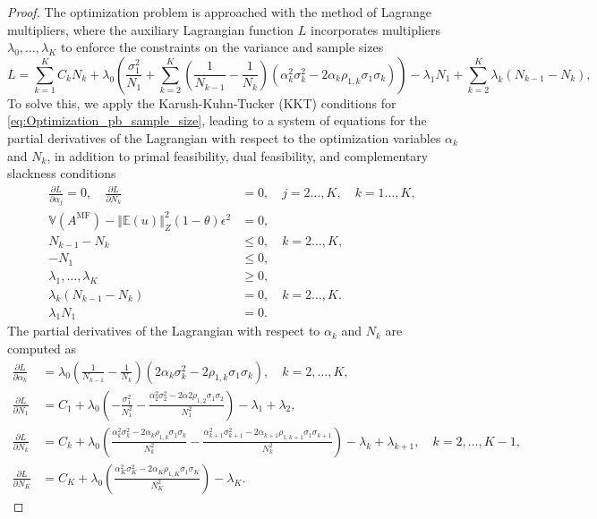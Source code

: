 \documentclass[final,3p,times,11pt]{elsarticle}
\begin{document}
\begin{proof}
The optimization problem is approached with the method of Lagrange multipliers, where the auxiliary Lagrangian function $L$ incorporates multipliers $\lambda_0,\ldots, \lambda_K$ to enforce the constraints on the variance and sample sizes
%
\[
L = \sum_{k=1}^K C_kN_k +\lambda_0 \left(\frac{\sigma_1^2}{N_1} + \sum_{k=2}^K \left(\frac{1}{N_{k-1}} - \frac{1}{N_k}\right)\left(\alpha_k^2\sigma_k^2 - 2\alpha_k\rho_{1,k}\sigma_1\sigma_k\right)\right)-\lambda_1 N_1+\sum_{k=2}^K\lambda_k(N_{k-1} - N_k),
\]
%
To solve this, we apply the Karush-Kuhn-Tucker (KKT) conditions for \eqref{eq:Optimization_pb_sample_size}, leading to a system of equations for the partial derivatives of the Lagrangian with respect to the optimization variables $\alpha_k$ and $N_k$,  in addition to  primal feasibility, dual feasibility, and complementary slackness conditions
%
\begin{align*}
\frac{\partial L}{\partial \alpha_j}=0,\quad \frac{\partial L}{\partial N_k}&=0,\quad j=2\ldots,K, \quad k=1\ldots,K,\\
\mathbb{V}\left(A^{\text{MF}}\right)- \left\Vert\mathbb{E}(u) \right\Vert_{Z}^2(1-\theta)\epsilon^2 &= 0,\\
    N_{k-1}-N_k&\le 0, \quad k=2\ldots,K,\\
    -N_1&\le 0,\\[6pt]
    \lambda_1,\ldots,\lambda_K &\ge 0,\\
    \lambda_k(N_{k-1}-N_k)&=0,\quad k=2\ldots,K.\\
    \lambda_1 N_1&=0.
\end{align*}
%
The partial derivatives of the Lagrangian with respect to $\alpha_k$ and $N_k$ are computed as
%
\begin{align*}
    \frac{\partial L}{\partial \alpha_k}&=\lambda_0\left(\frac{1}{N_{k-1}} - \frac{1}{N_k}\right)\left(2\alpha_k\sigma_k^2 - 2\rho_{1,k}\sigma_1\sigma_k\right),\quad k=2,\dots,K,\\
    \frac{\partial L}{\partial N_1}&=C_1 + \lambda_0\left(-\frac{\sigma_1^2}{N_1^2} - \frac{\alpha_2^2\sigma_2^2-2\alpha2\rho_{1,2}\sigma_1\sigma_2}{N_1^2}\right)-\lambda_1+\lambda_2,\\
    \frac{\partial L}{\partial N_k}&=C_k+\lambda_0\left(\frac{\alpha_k^2\sigma_k^2 - 2\alpha_k\rho_{1,k}\sigma_1\sigma_k}{N_k^2}-\frac{\alpha_{k+1}^2\sigma_{k+1}^2 - 2\alpha_{k+1}\rho_{1,k+1}\sigma_1\sigma_{k+1}}{N_k^2}\right)-\lambda_k+\lambda_{k+1}, \quad k=2,\dots,K-1,\\
    \frac{\partial L}{\partial N_K}&=C_K + \lambda_0\left(\frac{\alpha_K^2\sigma_K^2 - 2\alpha_K\rho_{1,K}\sigma_1\sigma_K}{N_K^2}\right)-\lambda_K.

\end{align*}
\end{proof}
\end{document}
